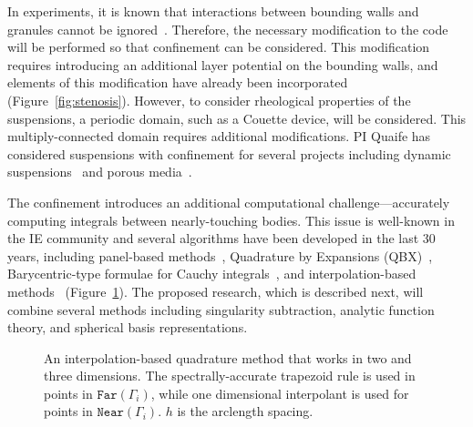 In experiments, it is known that interactions between bounding walls and
granules cannot be ignored~\cite{qua-gan-you2021,
KaouiHartingMisbah2011_PRE, her-sto-gra2005}. Therefore, the necessary
modification to the code will be performed so that confinement can be
considered. This modification requires introducing an additional layer
potential on the bounding walls, and elements of this modification have
already been incorporated (Figure~\ref{fig:stenosis}). However, to
consider rheological properties of the suspensions, a periodic domain,
such as a Couette device, will be considered. This multiply-connected
domain requires additional modifications. PI Quaife has considered
suspensions with confinement for several projects including dynamic
suspensions~\cite{qua-bir2014, bys-sha-qua2020} and porous
media~\cite{chi-moo-qua2020, dea-qua-bir-jua2018, moo-che-chi-qua2022,
qua-gan-you2021}. 

The confinement introduces an additional computational
challenge---accurately computing integrals between nearly-touching
bodies. This issue is well-known in the IE community and several
algorithms have been developed in the last 30 years, including
panel-based methods~\cite{helsing_2008a, helsing_tutorial_2012},
Quadrature by Expansions (QBX)~\cite{din-hua-mar-tan2021,
klo-bar-gre-one2013, ste-bar2022, af2018sisc}, Barycentric-type formulae
for Cauchy integrals~\cite{bar2014, bar-wu-vee2015, ioa-pap-per1991},
and interpolation-based methods~\cite{ying_2006, qua-bir2014,
rah-vee-zor-bir2015} (Figure~\ref{fig:interpquad}). The proposed
research, which is described next, will combine several methods
including singularity subtraction, analytic function theory, and
spherical basis representations.

\begin{figure}
  \centering
  
  \caption{\label{fig:interpquad} \footnotesize An interpolation-based
  quadrature method that works in two and three dimensions. The
  spectrally-accurate trapezoid rule is used in points in
  $\mathtt{Far}(\Gamma_i)$, while one dimensional interpolant is used
  for points in $\mathtt{Near}(\Gamma_i)$. $h$ is the arclength
  spacing.}
\end{figure}


